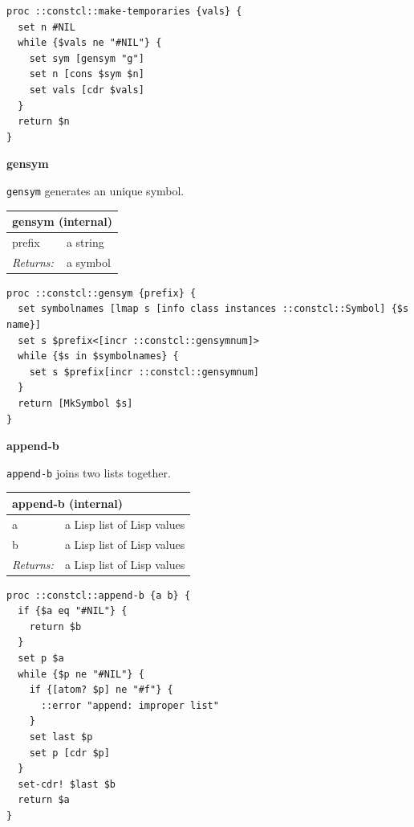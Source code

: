 \documentclass[twoside,9pt]{report}
\begin{document}
\noindent\makebox[\linewidth]{\rule{\linewidth}{0.4pt}}
\begin{lstlisting}
proc ::constcl::make-temporaries {vals} {
  set n #NIL
  while {$vals ne "#NIL"} {
    set sym [gensym "g"]
    set n [cons $sym $n]
    set vals [cdr $vals]
  }
  return $n
}
\end{lstlisting}
\noindent\makebox[\linewidth]{\rule{\linewidth}{0.4pt}}

\textbf{gensym}


\texttt{gensym} generates an unique symbol.

\begin{tabular}{ |l l| }
\hline
\multicolumn{2}{|l|}{gensym (internal)} \\
\hline
prefix & a string \\
\textit{Returns:} & a symbol \\
\hline
\end{tabular}

\noindent\makebox[\linewidth]{\rule{\linewidth}{0.4pt}}
\begin{lstlisting}
proc ::constcl::gensym {prefix} {
  set symbolnames [lmap s [info class instances ::constcl::Symbol] {$s name}]
  set s $prefix<[incr ::constcl::gensymnum]>
  while {$s in $symbolnames} {
    set s $prefix[incr ::constcl::gensymnum]
  }
  return [MkSymbol $s]
}
\end{lstlisting}
\noindent\makebox[\linewidth]{\rule{\linewidth}{0.4pt}}

\textbf{append-b}


\texttt{append-b} joins two lists together.

\begin{tabular}{ |l l| }
\hline
\multicolumn{2}{|l|}{append-b (internal)} \\
\hline
a & a Lisp list of Lisp values \\
b & a Lisp list of Lisp values \\
\textit{Returns:} & a Lisp list of Lisp values \\
\hline
\end{tabular}

\noindent\makebox[\linewidth]{\rule{\linewidth}{0.4pt}}
\begin{lstlisting}
proc ::constcl::append-b {a b} {
  if {$a eq "#NIL"} {
    return $b
  }
  set p $a
  while {$p ne "#NIL"} {
    if {[atom? $p] ne "#f"} {
      ::error "append: improper list"
    }
    set last $p
    set p [cdr $p]
  }
  set-cdr! $last $b
  return $a
}
\end{lstlisting}
\noindent\makebox[\linewidth]{\rule{\linewidth}{0.4pt}}
\end{document}
